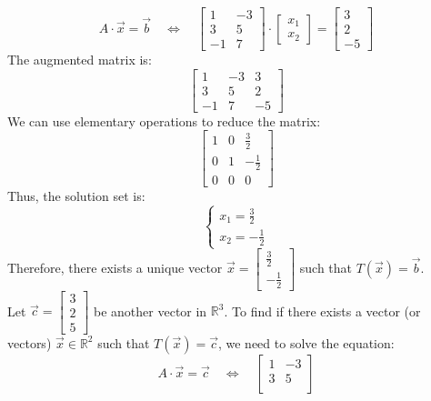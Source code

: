 \begin{eg}
    \[
        A \cdot \vec{x} = \vec{b} \quad \Leftrightarrow \quad \begin{bmatrix}
            1 & -3 \\
            3 & 5 \\
            -1 & 7
        \end{bmatrix} \cdot \begin{bmatrix} x_1 \\ x_2 \end{bmatrix} = \begin{bmatrix} 3 \\ 2 \\ -5 \end{bmatrix}
    \]
    The augmented matrix is:
    \[
        \begin{bmatrix}
            1 & -3 & 3 \\
            3 & 5 & 2 \\
            -1 & 7 & -5
        \end{bmatrix}
    \]
    We can use elementary operations to reduce the matrix:
    \[
        \begin{bmatrix}
            1 & 0 & \frac{3}{2} \\
            0 & 1 & -\frac{1}{2} \\
            0 & 0 & 0
        \end{bmatrix}
    \]
    Thus, the solution set is:
    \[
        \begin{cases}
            x_1 = \frac{3}{2} \\
            x_2 = -\frac{1}{2}
        \end{cases}
    \]
    Therefore, there exists a unique vector $\vec{x} = \begin{bmatrix} \frac{3}{2} \\ -\frac{1}{2} \end{bmatrix}$ such that $T(\vec{x}) = \vec{b}$. \\
    Let $\vec{c} = \begin{bmatrix} 3 \\ 2 \\ 5 \end{bmatrix}$ be another vector in $\mathbb{R}^3$. To find if there exists a vector (or vectors) $\vec{x} \in \mathbb{R}^2$ such that $T(\vec{x}) = \vec{c}$, we need to solve the equation:
    \[
        A \cdot \vec{x} = \vec{c} \quad \Leftrightarrow \quad \begin{bmatrix}
            1 & -3 \\
            3 & 5 \\

\end{bmatrix}\]
\end{eg}
